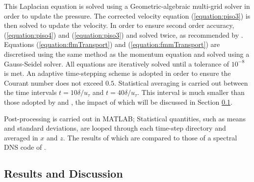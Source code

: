 \documentclass[12pt,oneside,a4paper]{article}
\begin{document}
This Laplacian equation is solved using a Geometric-algebraic multi-grid solver in order to update the pressure. The corrected velocity equation (\ref{equation:piso3}) is then solved to update the velocity. In order to ensure second order accuracy, (\ref{equation:piso4}) and (\ref{equation:piso3}) and solved twice, as recommended by \cite{issa1986}. Equations (\ref{equation:flmTransport}) and (\ref{equation:fmmTransport}) are discretised using the same method as the momentum equation and solved using a Gauss-Seidel solver. All equations are iteratively solved until a tolerance of $10^{-8}$ is met. An adaptive time-stepping scheme is adopted in order to ensure the Courant number does not exceed $0.5$. Statistical averaging is carried out between the time intervals $t=10 \delta / u_\tau$ and $t = 40 \delta / u_\tau$. This interval is much smaller than those adopted by \cite{kim1987} and \cite{vreman2014}, the impact of which will be discussed in Section \ref{section:lesResults}.

Post-processing is carried out in MATLAB; Statistical quantities, such as means and standard deviations, are looped through each time-step directory and averaged in $x$ and $z$. The results of which are compared to those of a spectral DNS code of \cite{vreman2014}.

\subsection{Results and Discussion}
\label{section:lesResults}
\end{document}
